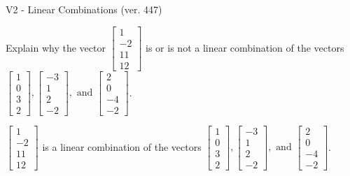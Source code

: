 \begin{exercise}
  \begin{exerciseTitle}V2 - Linear Combinations (ver. 447)\end{exerciseTitle}
  \begin{exerciseStatement}
    Explain why the vector \(\left[\begin{array}{c}
1 \\
-2 \\
11 \\
12
\end{array}\right]\)  is or is not a linear 
	combination of the vectors \(\left[\begin{array}{c}
1 \\
0 \\
3 \\
2
\end{array}\right] , \left[\begin{array}{c}
-3 \\
1 \\
2 \\
-2
\end{array}\right] , \text{ and } \left[\begin{array}{c}
2 \\
0 \\
-4 \\
-2
\end{array}\right]\).
	


  \end{exerciseStatement}
  \begin{exerciseAnswer}
   \(\left[\begin{array}{c}
1 \\
-2 \\
11 \\
12
\end{array}\right]\) 
  	 is  
	a linear combination of the vectors \(\left[\begin{array}{c}
1 \\
0 \\
3 \\
2
\end{array}\right] , \left[\begin{array}{c}
-3 \\
1 \\
2 \\
-2
\end{array}\right] , \text{ and } \left[\begin{array}{c}
2 \\
0 \\
-4 \\
-2
\end{array}\right]\).

	
  


  \end{exerciseAnswer}
\end{exercise}